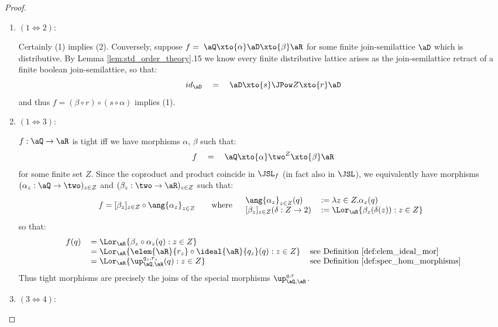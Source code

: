 \documentclass{article}
\begin{document}
\begin{proof}
\item
\begin{enumerate}
\item
$(1 \iff 2)$:

Certainly (1) implies (2). Conversely, suppose $f =\; \aQ \xto{\alpha} \aD \xto{\beta} \aR$ for some finite join-semilattice $\aD$ which is distributive. By Lemma \ref{lem:std_order_theory}.15 we know every finite distributive lattice arises as the join-semilattice retract of a finite boolean join-semilattice, so that:
\[
id_\aD \quad = \quad \aD \xto{s} \JPow Z \xto{r} \aD
\]
and thus $f = (\beta \circ r) \circ (s \circ \alpha)$ implies (1).

\item
$(1 \iff 3)$:

$f : \aQ \to \aR$ is tight iff we have morphisms $\alpha$, $\beta$ such that:
\[
f 
\quad = \quad
\aQ \xto{\alpha} \two^Z \xto{\beta} \aR
\]
for some finite set $Z$. Since the coproduct and product coincide in $\JSL_f$ (in fact also in $\JSL$), we equivalently have morphisms $(\alpha_z : \aQ \to \two)_{z \in Z}$ and $(\beta_z : \two \to \aR)_{z \in Z}$ such that:
\[
f = [\beta_z]_{z \in Z} \circ \ang{\alpha_z}_{z \in Z}
\qquad
\text{where}\quad
\begin{tabular}{ll}
$\ang{\alpha_z}_{z \in Z}(q)$ & $:= \lambda z \in Z. \alpha_z(q)$
\\
$[\beta_z]_{z \in Z}(\delta : Z \to 2)$ & $:= \Lor_\aR \{ \beta_z(\delta(z)) : z\in Z \}$
\end{tabular}
\]
so that:
\[
\begin{tabular}{lll}
$f(q)$
& 
$= \Lor_\aR \{ \beta_z \circ \alpha_z(q) : z \in Z \}$
\\&
$= \Lor_\aR \{ \elem{\aR}{r_z} \circ \ideal{\aR}{q_z}(q) : z \in Z \}$
& see Definition \ref{def:elem_ideal_mor}
\\&
$= \Lor_\aR \{ \up_{\aQ,\aR}^{q_z,r_z}(q) : z \in Z \}$
& see Definition \ref{def:spec_hom_morphisms}
\end{tabular}
\]
Thus tight morphisms are precisely the joins of the special morphisms $\up_{\aQ,\aR}^{q,r}$.

\item
$(3 \iff 4)$:


\end{enumerate}
\end{proof}
\end{document}
